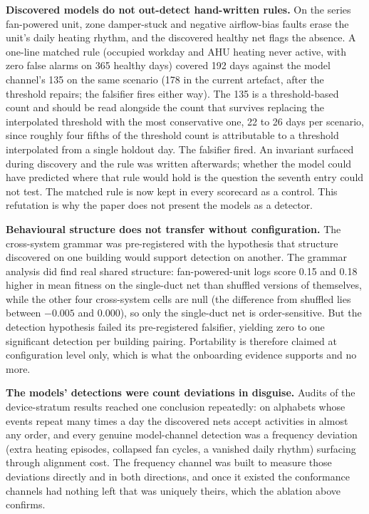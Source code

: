 \documentclass[11pt,letterpaper]{article}
\begin{document}
\textbf{Discovered models do not out-detect hand-written rules.} On the series fan-powered unit, zone damper-stuck and negative airflow-bias faults erase the unit's daily heating rhythm, and the discovered healthy net flags the absence. A one-line matched rule (occupied workday and AHU heating never active, with zero false alarms on 365 healthy days) covered 192 days against the model channel's 135 on the same scenario (178 in the current artefact, after the threshold repairs; the falsifier fires either way). The 135 is a threshold-based count and should be read alongside the count that survives replacing the interpolated threshold with the most conservative one, 22 to 26 days per scenario, since roughly four fifths of the threshold count is attributable to a threshold interpolated from a single holdout day. The falsifier fired. An invariant surfaced during discovery and the rule was written afterwards; whether the model could have predicted where that rule would hold is the question the seventh entry could not test. The matched rule is now kept in every scorecard as a control. This refutation is why the paper does not present the models as a detector.

\textbf{Behavioural structure does not transfer without configuration.} The cross-system grammar was pre-registered with the hypothesis that structure discovered on one building would support detection on another. The grammar analysis did find real shared structure: fan-powered-unit logs score 0.15 and 0.18 higher in mean fitness on the single-duct net than shuffled versions of themselves, while the other four cross-system cells are null (the difference from shuffled lies between $-0.005$ and $0.000$), so only the single-duct net is order-sensitive. But the detection hypothesis failed its pre-registered falsifier, yielding zero to one significant detection per building pairing. Portability is therefore claimed at configuration level only, which is what the onboarding evidence supports and no more.

\textbf{The models' detections were count deviations in disguise.} Audits of the device-stratum results reached one conclusion repeatedly: on alphabets whose events repeat many times a day the discovered nets accept activities in almost any order, and every genuine model-channel detection was a frequency deviation (extra heating episodes, collapsed fan cycles, a vanished daily rhythm) surfacing through alignment cost. The frequency channel was built to measure those deviations directly and in both directions, and once it existed the conformance channels had nothing left that was uniquely theirs, which the ablation above confirms.
\end{document}
